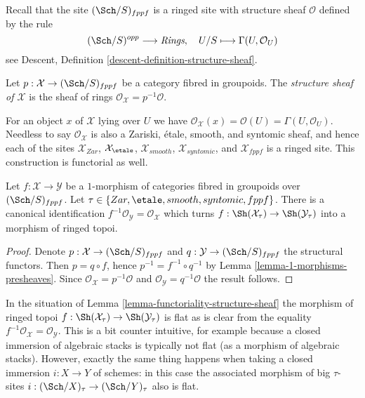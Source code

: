\medskip\noindent
Recall that the site $(\Sch/S)_{fppf}$ is a ringed site
with structure sheaf $\mathcal{O}$ defined by the rule
$$
(\Sch/S)^{opp} \longrightarrow \textit{Rings},
\quad
U/S \longmapsto \Gamma(U, \mathcal{O}_U)
$$
see
Descent, Definition \ref{descent-definition-structure-sheaf}.

\begin{definition}
\label{definition-structure-sheaf}
Let $p : \mathcal{X} \to (\Sch/S)_{fppf}$ be a category
fibred in groupoids. The
{\it structure sheaf of $\mathcal{X}$} is the sheaf of rings
$\mathcal{O}_\mathcal{X} = p^{-1}\mathcal{O}$.
\end{definition}

\noindent
For an object $x$ of $\mathcal{X}$ lying over $U$ we have
$\mathcal{O}_\mathcal{X}(x) = \mathcal{O}(U) = \Gamma(U, \mathcal{O}_U)$.
Needless to say $\mathcal{O}_\mathcal{X}$ is also a Zariski, \'etale,
smooth, and syntomic sheaf, and hence each of the sites
$\mathcal{X}_{Zar}$, $\mathcal{X}_\etale$, $\mathcal{X}_{smooth}$,
$\mathcal{X}_{syntomic}$, and $\mathcal{X}_{fppf}$ is a ringed site.
This construction is functorial as well.

\begin{lemma}
\label{lemma-functoriality-structure-sheaf}
Let $f : \mathcal{X} \to \mathcal{Y}$ be a $1$-morphism of categories
fibred in groupoids over $(\Sch/S)_{fppf}$. Let
$\tau \in \{Zar, \etale, smooth, syntomic, fppf\}$.
There is a canonical identification
$f^{-1}\mathcal{O}_\mathcal{Y} = \mathcal{O}_\mathcal{X}$
which turns
$f : \Sh(\mathcal{X}_\tau) \to \Sh(\mathcal{Y}_\tau)$
into a morphism of ringed topoi.
\end{lemma}

\begin{proof}
Denote $p : \mathcal{X} \to (\Sch/S)_{fppf}$ and
$q : \mathcal{Y} \to (\Sch/S)_{fppf}$ the structural functors.
Then $p = q \circ f$, hence $p^{-1} = f^{-1} \circ q^{-1}$ by
Lemma \ref{lemma-1-morphisms-presheaves}. Since
$\mathcal{O}_\mathcal{X} = p^{-1}\mathcal{O}$ and
$\mathcal{O}_\mathcal{Y} = q^{-1}\mathcal{O}$
the result follows.
\end{proof}

\begin{remark}
\label{remark-flat}
In the situation of
Lemma \ref{lemma-functoriality-structure-sheaf}
the morphism of ringed topoi
$f : \Sh(\mathcal{X}_\tau) \to \Sh(\mathcal{Y}_\tau)$
is flat as is clear from the equality
$f^{-1}\mathcal{O}_\mathcal{X} = \mathcal{O}_\mathcal{Y}$.
This is a bit counter intuitive, for example because a closed
immersion of algebraic stacks is typically not flat (as a morphism of
algebraic stacks).
However, exactly the same thing happens when taking a closed
immersion $i : X \to Y$ of schemes: in this case the associated
morphism of big $\tau$-sites
$i : (\Sch/X)_\tau \to (\Sch/Y)_\tau$
also is flat.
\end{remark}




